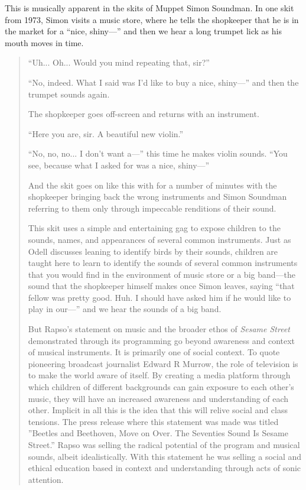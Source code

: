 \documentclass[12pt,letterpaper]{article}
\newcommand{\ses}{\textit{Sesame Street }}
\begin{document}
	This is musically apparent in the skits of Muppet Simon Soundman.
	In one skit from 1973,\autocite{0458} Simon visits a music store, where
	he tells the shopkeeper
	that he is in the market for a ``nice, shiny---'' and then we hear a
	long trumpet lick as his mouth moves in time. 

	\begin{quote}
	``Uh... Oh... Would you mind repeating that, sir?''

	``No, indeed. What I said was I'd like to buy a nice, shiny---'' and
	then the trumpet sounds again. 

	The shopkeeper goes off-screen and returns with an instrument. 
	 
	``Here you are, sir. A beautiful new violin.''

	``No, no, no... I don't want a---'' this time he makes violin
	sounds.  ``You see, because what I asked for was a nice, shiny---''
	
	And the skit goes on like this with for a number of minutes with the 
	shopkeeper bringing back the wrong instruments and Simon Soundman
	referring to them only through impeccable renditions of their sound. 
	
	This skit uses a simple and entertaining gag to expose children to the
	sounds, names, and appearances of several common instruments. Just as 
	Odell
	discusses leaning to identify birds by their sounds, children are	
	taught here to learn to identify the sounds of several common 
	instruments that you would find in the environment of music store or 
	a big band---the sound that the shopkeeper himself makes once Simon
	leaves, saying ``that fellow was pretty good. Huh. I should have asked
	him if he would like to play in our---'' and we hear the sounds of a
	big band.  

	But Rapso's statement on music and the broader ethos of \ses 
	demonstrated through its programming go beyond awareness and context of 
	musical instruments. It is primarily one of social context. To quote 
	pioneering broadcast journalist Edward R Murrow,
	the role of television is to make the world aware of
	itself.\autocite[49]{Davis} By creating a media platform through which 
	children of different backgrounds can gain exposure to each other's 
	music, they
	will have an increased awareness and understanding of each other.
	Implicit in all this is the idea that this will relive social and class
	tensions. The press release where this statement was made was titled 
	''Beetles and Beethoven, Move on Over. The Seventies Sound Is Sesame 
	Street.'' Rapso was selling the radical potential of the program and
	musical sounds, albeit idealistically. With this statement he was 
	selling a social and ethical education based in context and 
	understanding through acts of sonic attention. 


\end{quote}
\end{document}
